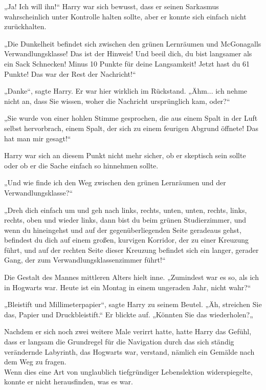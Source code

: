 {„Ja! Ich will ihn!“ Harry war sich bewusst, dass er seinen Sarkasmus wahrscheinlich unter Kontrolle halten sollte, aber er konnte sich einfach nicht zurückhalten.

„Die Dunkelheit befindet sich zwischen den grünen Lernräumen und McGonagalls Verwandlungsklasse! Das ist der Hinweis! Und beeil dich, du bist langsamer als ein Sack Schnecken! Minus 10 Punkte für deine Langsamkeit! Jetzt hast du 61 Punkte! Das war der Rest der Nachricht!“

„Danke“, sagte Harry. Er war hier wirklich im Rückstand. „Ähm... ich nehme nicht an, dass Sie wissen, woher die Nachricht ursprünglich kam, oder?“

„Sie wurde von einer hohlen Stimme gesprochen, die aus einem Spalt in der Luft selbst hervorbrach, einem Spalt, der sich zu einem feurigen Abgrund öffnete! Das hat man mir gesagt!“

Harry war sich an diesem Punkt nicht mehr sicher, ob er skeptisch sein sollte oder ob er die Sache einfach so hinnehmen sollte.

„Und wie finde ich den Weg zwischen den grünen Lernräumen und der Verwandlungsklasse?“

„Dreh dich einfach um und geh nach links, rechts, unten, unten, rechts, links, rechts, oben und wieder links, dann bist du beim grünen Studierzimmer, und wenn du hineingehst und auf der gegenüberliegenden Seite geradeaus gehst, befindest du dich auf einem großen, kurvigen Korridor, der zu einer Kreuzung führt, und auf der rechten Seite dieser Kreuzung befindet sich ein langer, gerader Gang, der zum Verwandlungsklassenzimmer führt!“

Die Gestalt des Mannes mittleren Alters hielt inne. „Zumindest war es so, als ich in Hogwarts war. Heute ist ein Montag in einem ungeraden Jahr, nicht wahr?“

„Bleistift und Millimeterpapier“, sagte Harry zu seinem Beutel. „Äh, streichen Sie das, Papier und Druckbleistift.“ Er blickte auf. „Könnten Sie das wiederholen?„

Nachdem er sich noch zwei weitere Male verirrt hatte, hatte Harry das Gefühl, dass er langsam die Grundregel für die Navigation durch das sich ständig verändernde Labyrinth, das Hogwarts war, verstand, nämlich ein Gemälde nach dem Weg zu fragen.\\ Wenn dies eine Art von unglaublich tiefgründiger Lebenslektion widerspiegelte, konnte er nicht herausfinden, was es war.

}
